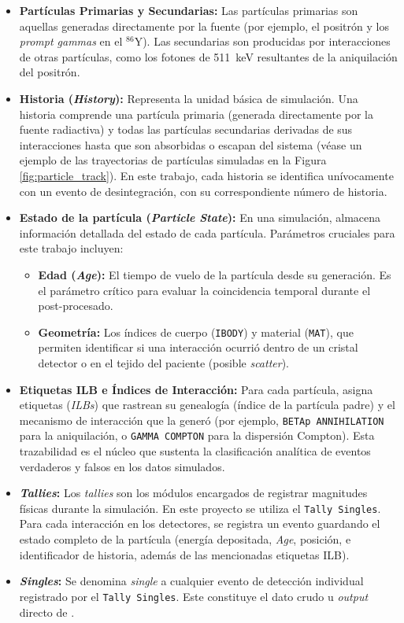 \begin{itemize}
  \item \textbf{Partículas Primarias y Secundarias:} Las partículas primarias son aquellas generadas directamente por la fuente (por ejemplo, el positrón y los \textit{prompt gammas} en el $^{86}\text{Y}$). Las secundarias son producidas por interacciones de otras partículas, como los fotones de \SI{511}{\kilo\electronvolt} resultantes de la aniquilación del positrón.
  \item \textbf{Historia (\textit{History}):} Representa la unidad básica de simulación. Una historia comprende una partícula primaria (generada directamente por la fuente radiactiva) y todas las partículas secundarias derivadas de sus interacciones hasta que son absorbidas o escapan del sistema (véase un ejemplo de las trayectorias de partículas simuladas en la Figura \ref{fig:particle_track}). En este trabajo, cada historia se identifica unívocamente con un evento de desintegración, con su correspondiente número de historia.
  \item \textbf{Estado de la partícula (\textit{Particle State}):} En una simulación, \penred almacena información detallada del estado de cada partícula. Parámetros cruciales para este trabajo incluyen:
        \begin{itemize}
          \item \textbf{Edad (\textit{Age}):} El tiempo de vuelo de la partícula desde su generación. Es el parámetro crítico para evaluar la coincidencia temporal durante el post-procesado.
          \item \textbf{Geometría:} Los índices de cuerpo (\texttt{IBODY}) y material (\texttt{MAT}), que permiten identificar si una interacción ocurrió dentro de un cristal detector o en el tejido del paciente (posible \textit{scatter}).
        \end{itemize}
  \item \textbf{Etiquetas ILB e Índices de Interacción:} Para cada partícula, \penred asigna etiquetas (\textit{ILBs}) que rastrean su genealogía (índice de la partícula padre) y el mecanismo de interacción que la generó (por ejemplo, \texttt{BETAp ANNIHILATION} para la aniquilación, o \texttt{GAMMA COMPTON} para la dispersión Compton). Esta trazabilidad es el núcleo que sustenta la clasificación analítica de eventos verdaderos y falsos en los datos simulados.
  \item \textbf{\textit{Tallies}:} Los \textit{tallies} son los módulos encargados de registrar magnitudes físicas durante la simulación. En este proyecto se utiliza el \texttt{Tally Singles}. Para cada interacción en los detectores, se registra un evento guardando el estado completo de la partícula (energía depositada, \textit{Age}, posición, e identificador de historia, además de las mencionadas etiquetas ILB).
  \item \textbf{\textit{Singles}:} Se denomina \textit{single} a cualquier evento de detección individual registrado por el \texttt{Tally Singles}. Este constituye el dato crudo u \textit{output} directo de \penred.
\end{itemize}

